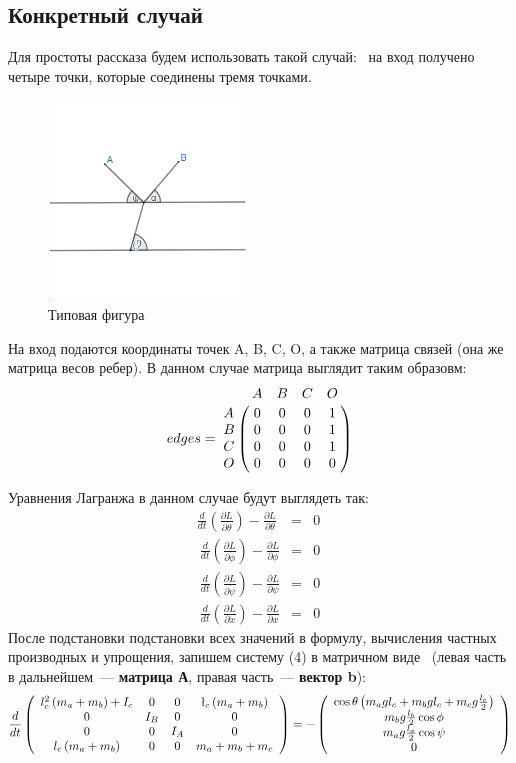 \subsection{Конкретный случай}
Для простоты рассказа будем использовать такой случай:~ на вход получено четыре точки, которые соединены тремя точками.
\begin{figure}[h!]
	\centering
	\includegraphics[width=200px, height=200px]{rogatka.png}
	\caption{Типовая фигура}
\end{figure} 
На вход подаются координаты точек A, B, C, O, а также матрица связей (она же матрица весов ребер).  В данном случае матрица выглядит таким образовм:
\[ edges = \bordermatrix{
        & A & B & C & O \cr
    A   & 0 & 0 & 0 & 1 \cr
    B   & 0 & 0 & 0 & 1 \cr
    C   & 0 & 0 & 0 & 1 \cr 
    O   & 0 & 0 & 0 & 0 \cr
}
\]
\par Уравнения Лагранжа в данном случае будут выглядеть так:
\begin{eqnarray}
\frac{d}{dt}\left(\frac{\partial L}{\partial \dot{\theta}} \right)-\frac{\partial L}{\partial \theta} & = & 0 \\ 
\ \frac{d}{dt}\left(\frac{\partial L}{\partial \dot{\phi}} \right)-\frac{\partial L}{\partial \phi} & = & 0 \\
\ \frac{d}{dt}\left(\frac{\partial L}{\partial \dot{\psi}} \right)-\frac{\partial L}{\partial \psi} & = & 0 \\
\ \frac{d}{dt}\left(\frac{\partial L}{\partial \dot{x}} \right)-\frac{\partial L}{\partial x} & = & 0 \ 
\end{eqnarray}
После подстановки подстановки всех значений в формулу, вычисления частных производных и упрощения, запишем систему (4) в матричном виде~ (левая часть в дальнейшем~---\textbf{ матрица А}, правая часть~--- \textbf{вектор b}):
\[\frac{d}{dt}\left( \begin{array}{cccc}
l_c^2\left(m_a + m_b \right)+I_c& 0 & 0 & \l_c\left(m_a + m_b\right)\\
        0           &       I_B         &       0       &       0 \\
        0           &       0         &       I_A        &       0 \\
l_c\left(m_a + m_b \right)& 0 & 0 & m_a + m_b + m_c        
\end{array}\right) = 
- \left( \begin{array}{c}
\cos{\theta}\left( m_a g l_c  + m_b g l_c + m_c g \frac{l_c}{2}\right) \\
 m_b g \frac{l_b}{2} \cos{\phi} \\
 m_a g \frac{l_a}{2} \cos{\psi} \\
  0
\end{array}\right)
\]
